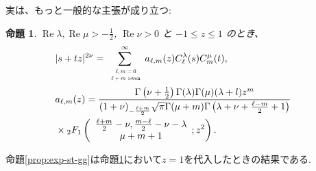 \documentclass[pdf,notes]{beamer}
\newcommand{\tmop}[1]{\ensuremath{\operatorname{#1}}}
\newtheorem{prop}{命題}
\begin{document}
\begin{frame}
	実は、もっと一般的な主張が成り立つ:
	\begin{prop}\label{prop:exp-stz-gg}
		  \label{thm:4}$\tmop{Re} \lambda, \tmop{Re} \mu > - \frac{1}{2}$,
		    $\tmop{Re} \nu > 0$ と $-1 \leqslant z \leqslant 1$ のとき、
		      \begin{eqnarray}
			      & | s + t z |^{2 \nu}  = \sum_{\scalebox{0.6}{
				      $\begin{array}[]{c}
						  \ell,m=0\\\ell+ m\mbox{ :even}
					  \end{array}
				  $}}^{\infty} a_{\ell, m}
					          (z) C_\ell^{\lambda} (s) C_m^{\mu} (t), &  \nonumber\\
						      & a_{\ell, m} (z) = \frac{\Gamma \left( \nu + \frac{1}{2} \right) \Gamma
						      (\lambda) \Gamma (\mu) (\lambda + l) z^m }{(1 + \nu)_{- \frac{\ell + m}{2}} \sqrt{\pi} \Gamma
										      (\mu + m) \Gamma \left( \lambda + \nu + \frac{\ell - m}{2} + 1 \right)}&\nonumber
										      \\&\times{}_2 F_1 \left( \begin{array}{c}
								        \frac{\ell + m}{2} - \nu, \frac{m - \ell}{2} - \nu - \lambda\\
									      \mu + m + 1
									          \end{array} ; z^2 \right). & 
										          \nonumber
											    \end{eqnarray}
    \end{prop}
    命題\ref{prop:exp-st-gg}は命題\ref{prop:exp-stz-gg}において$z=1$を代入したときの結果である.
\end{frame}
\end{document}
